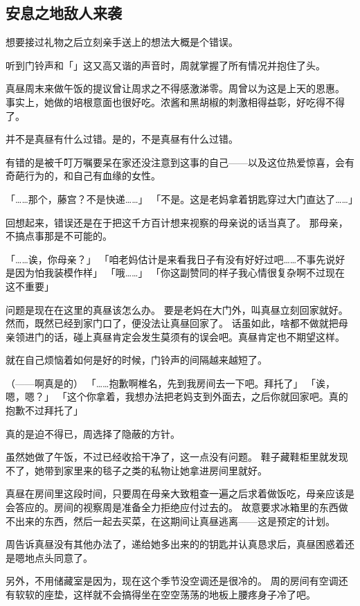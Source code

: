 \subsection{安息之地敌人来袭}

想要接过礼物之后立刻亲手送上的想法大概是个错误。

听到门铃声和「」这又高又谐的声音时，周就掌握了所有情况并抱住了头。

\vspace{2\baselineskip}

真昼周末来做午饭的提议曾让周求之不得感激涕零。周曾以为这是上天的恩惠。
事实上，她做的培根意面也很好吃。浓酱和黑胡椒的刺激相得益彰，好吃得不得了。

并不是真昼有什么过错。是的，不是真昼有什么过错。

有错的是被千叮万嘱要呆在家还没注意到这事的自己——以及这位热爱惊喜，会有奇葩行为的，和自己有血缘的女性。

「……那个，藤宫？不是快递……」
「不是。这是老妈拿着钥匙穿过大门直达了……」

回想起来，错误还是在于把这千方百计想来视察的母亲说的话当真了。
那母亲，不搞点事那是不可能的。

「……诶，你母亲？」
「咱老妈估计是来看我日子有没有好好过吧……不事先说好是因为怕我装模作样」
「哦……」
「你这副赞同的样子我心情很复杂啊不过现在这不重要」

问题是现在在这里的真昼该怎么办。
要是老妈在大门外，叫真昼立刻回家就好。然而，既然已经到家门口了，便没法让真昼回家了。
话虽如此，啥都不做就把母亲领进门的话，碰上真昼肯定会发生莫须有的误会吧。真昼肯定也不期望这样。

就在自己烦恼着如何是好的时候，门铃声的间隔越来越短了。

（——啊真是的）
「……抱歉啊椎名，先到我房间去一下吧。拜托了」
「诶，嗯，嗯？」
「这个你拿着，我想办法把老妈支到外面去，之后你就回家吧。真的抱歉不过拜托了」

真的是迫不得已，周选择了隐蔽的方针。

虽然她做了午饭，不过已经收拾干净了，这一点没有问题。
鞋子藏鞋柜里就发现不了，她带到家里来的毯子之类的私物让她拿进房间里就好。

真昼在房间里这段时间，只要周在母亲大致粗查一遍之后求着做饭吃，母亲应该是会答应的。房间的视察周是准备全力拒绝应付过去的。
故意要求冰箱里的东西做不出来的东西，然后一起去买菜，在这期间让真昼逃离——这是预定的计划。

周告诉真昼没有其他办法了，递给她多出来的的钥匙并认真恳求后，真昼困惑着还是嗯地点头同意了。

另外，不用储藏室是因为，现在这个季节没空调还是很冷的。
周的房间有空调还有软软的座垫，这样就不会搞得坐在空空荡荡的地板上腰疼身子冷了吧。

